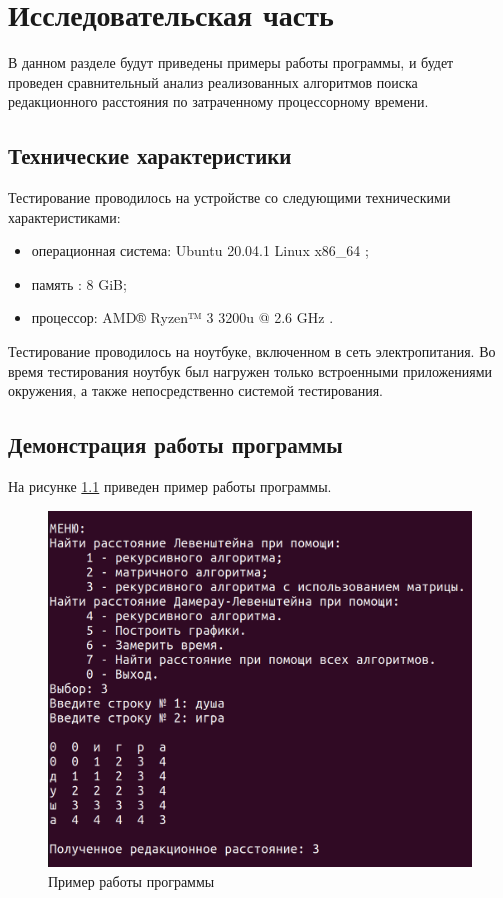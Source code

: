 \chapter{Исследовательская часть}

В данном разделе будут приведены примеры работы программы, и будет проведен сравнительный анализ реализованных алгоритмов поиска редакционного расстояния по затраченному процессорному времени.

\section{Технические характеристики}

Тестирование проводилось на устройстве со следующими техническими характеристиками:

\begin{itemize}
	\item операционная система: Ubuntu 20.04.1 Linux x86\_64 \cite{linux};
	\item память : 8 GiB;
	\item процессор: AMD® Ryzen™ 3 3200u @ 2.6 GHz \cite{amd}.
\end{itemize}

Тестирование проводилось на ноутбуке, включенном в сеть электропитания. Во время тестирования ноутбук был нагружен только встроенными приложениями окружения, а также непосредственно системой тестирования.

\clearpage

\section{Демонстрация работы программы}

На рисунке \ref{img:example} приведен пример работы программы.

\begin{figure}[H]
	\begin{center}
		\includegraphics[scale=0.4]{img/example.png}
	\end{center}
	\captionsetup{justification=centering}
	\caption{Пример работы программы}
	\label{img:example}
\end{figure}


